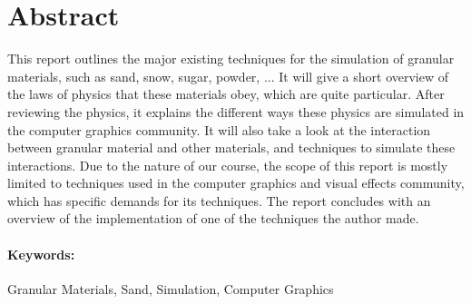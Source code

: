 
\ifx\isEmbedded\undefined


\fi

\section*{Abstract}
\label{sec:abstract}

This report outlines the major existing techniques for the simulation of granular materials, such as sand, snow, sugar, powder, ...  It will give a short overview of the laws of physics that these materials obey, which are quite particular. After reviewing the physics, it explains the different ways these physics are simulated in the computer graphics community. It will also take a look at the interaction between granular material and other materials, and techniques to simulate these interactions. Due to the nature of our course, the scope of this report is mostly limited to techniques used in the computer graphics and visual effects community, which has specific demands for its techniques. The report concludes with an overview of the implementation of one of the techniques the author made.

\paragraph*{Keywords:}{Granular Materials, Sand, Simulation, Computer Graphics}



\ifx\isEmbedded\undefined


\pagebreak

\fi